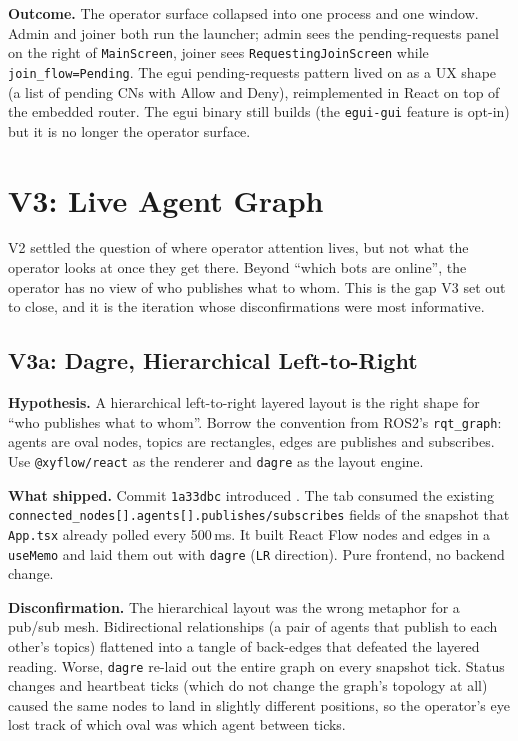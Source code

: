 \documentclass[11pt,a4paper]{article}
\begin{document}
\textbf{Outcome.} The operator surface collapsed into one process
and one window. Admin and joiner both run the launcher; admin
sees the pending-requests panel on the right of
\texttt{MainScreen}, joiner sees \texttt{RequestingJoinScreen}
while \texttt{join\_flow=Pending}. The egui pending-requests
pattern lived on as a UX shape (a list of pending CNs with
Allow and Deny), reimplemented in React on top of the embedded
router. The egui binary still builds (the
\texttt{egui-gui} feature is opt-in) but it is no longer the
operator surface.

\section{V3: Live Agent Graph}

V2 settled the question of where operator attention lives, but
not what the operator looks at once they get there. Beyond
``which bots are online'', the operator has no view of who
publishes what to whom. This is the gap V3 set out to close, and
it is the iteration whose disconfirmations were most informative.

\subsection{V3a: Dagre, Hierarchical Left-to-Right}

\textbf{Hypothesis.} A hierarchical left-to-right layered layout
is the right shape for ``who publishes what to whom''. Borrow
the convention from ROS2's \texttt{rqt\_graph}: agents are oval
nodes, topics are rectangles, edges are publishes and subscribes.
Use \texttt{@xyflow/react} as the renderer and \texttt{dagre} as
the layout engine.

\textbf{What shipped.} Commit \texttt{1a33dbc} introduced
.
The tab consumed the existing
\texttt{connected\_nodes[].agents[].publishes/subscribes} fields
of the snapshot that \texttt{App.tsx} already polled every
500\,ms. It built React Flow nodes and edges in a \texttt{useMemo}
and laid them out with \texttt{dagre} (\texttt{LR} direction).
Pure frontend, no backend change.

\textbf{Disconfirmation.} The hierarchical layout was the wrong
metaphor for a pub/sub mesh. Bidirectional relationships (a pair
of agents that publish to each other's topics) flattened into a
tangle of back-edges that defeated the layered reading. Worse,
\texttt{dagre} re-laid out the entire graph on every snapshot
tick. Status changes and heartbeat ticks (which do not change
the graph's topology at all) caused the same nodes to land in
slightly different positions, so the operator's eye lost track
of which oval was which agent between ticks.
\end{document}
